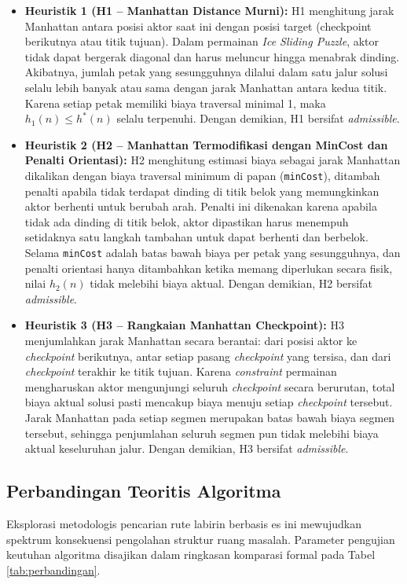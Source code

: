 \documentclass[12pt,a4paper]{article}
\begin{document}
\begin{itemize}
    \item \textbf{Heuristik 1 (H1 -- Manhattan Distance Murni):}
    H1 menghitung jarak Manhattan antara posisi aktor saat ini dengan posisi target
    (checkpoint berikutnya atau titik tujuan). Dalam permainan \textit{Ice Sliding
    Puzzle}, aktor tidak dapat bergerak diagonal dan harus meluncur hingga menabrak
    dinding. Akibatnya, jumlah petak yang sesungguhnya dilalui dalam satu jalur solusi
    selalu lebih banyak atau sama dengan jarak Manhattan antara kedua titik. Karena
    setiap petak memiliki biaya traversal minimal 1, maka $h_1(n) \leq h^*(n)$ selalu
    terpenuhi. Dengan demikian, H1 bersifat \textit{admissible}.

    \item \textbf{Heuristik 2 (H2 -- Manhattan Termodifikasi dengan MinCost dan
    Penalti Orientasi):}
    H2 menghitung estimasi biaya sebagai jarak Manhattan dikalikan dengan biaya
    traversal minimum di papan (\texttt{minCost}), ditambah penalti apabila tidak
    terdapat dinding di titik belok yang memungkinkan aktor berhenti untuk berubah
    arah. Penalti ini dikenakan karena apabila tidak ada dinding di titik belok,
    aktor dipastikan harus menempuh setidaknya satu langkah tambahan untuk dapat
    berhenti dan berbelok. Selama \texttt{minCost} adalah batas bawah biaya per
    petak yang sesungguhnya, dan penalti orientasi hanya ditambahkan ketika memang
    diperlukan secara fisik, nilai $h_2(n)$ tidak melebihi biaya aktual. Dengan
    demikian, H2 bersifat \textit{admissible}.

    \item \textbf{Heuristik 3 (H3 -- Rangkaian Manhattan Checkpoint):}
    H3 menjumlahkan jarak Manhattan secara berantai: dari posisi aktor ke
    \textit{checkpoint} berikutnya, antar setiap pasang \textit{checkpoint} yang
    tersisa, dan dari \textit{checkpoint} terakhir ke titik tujuan. Karena
    \textit{constraint} permainan mengharuskan aktor mengunjungi seluruh
    \textit{checkpoint} secara berurutan, total biaya aktual solusi pasti mencakup
    biaya menuju setiap \textit{checkpoint} tersebut. Jarak Manhattan pada setiap
    segmen merupakan batas bawah biaya segmen tersebut, sehingga penjumlahan
    seluruh segmen pun tidak melebihi biaya aktual keseluruhan jalur. Dengan
    demikian, H3 bersifat \textit{admissible}.
\end{itemize}

\subsection{Perbandingan Teoritis Algoritma}
Eksplorasi metodologis pencarian rute labirin berbasis es ini mewujudkan spektrum konsekuensi pengolahan struktur ruang masalah. Parameter pengujian keutuhan algoritma disajikan dalam ringkasan komparasi formal pada Tabel \ref{tab:perbandingan}.
\end{document}
